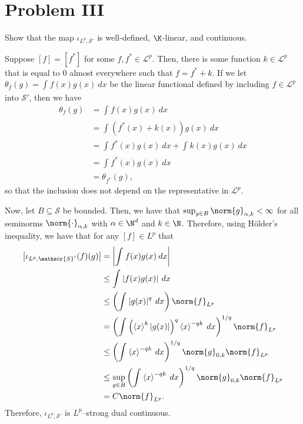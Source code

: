 \documentclass[10pt]{mypackage}
\begin{document}
\section{Problem III}%
\begin{problem}
  Show that the map $\iota_{L^p,\mathscr{S}'}$ is well-defined, $\K$-linear, and continuous.
\end{problem}
\begin{solution}
  Suppose $\left[ f \right] = \left[ f^{\ast} \right]$ for some $f,f^{\ast}\in \mathscr{L}^p$. Then, there is some function $k\in \mathscr{L}^{p}$ that is equal to $0$ almost everywhere such that $f = f^{\ast} + k$. If we let $\theta_{f}(g) = \int_{}^{} f(x)g(x)\:dx$ be the linear functional defined by including $f\in \mathscr{L}^{p}$ into $\mathscr{S}'$, then we have
  \begin{align*}
    \theta_{f}(g) &= \int_{}^{} f(x)g(x)\:dx\\
                  &= \int_{}^{} \left( f^{\ast}(x) + k(x) \right)g(x)\:dx\\
                  &= \int_{}^{} f^{\ast}\left( x \right)g(x)\:dx + \int_{}^{} k(x)g(x)\:dx\\
                  &= \int_{}^{} f^{\ast}\left( x \right)g(x)\:dx\\
                  &= \theta_{f^{\ast}}(g),
  \end{align*}
  so that the inclusion does not depend on the representative in $ \mathcal{L}^p $.

  Now, let $B\subseteq \mathscr{S}$ be bounded. Then, we have that $\sup_{g\in B}\norm{g}_{\alpha,k} < \infty$ for all seminorms $\norm{\cdot}_{\alpha,k}$ with $\alpha\in \N^d$ and $k\in \N$. Therefore, using Hölder's inequality, we have that for any $[f]\in L^p$ that
  \begin{align*}
    \left\vert \iota_{L^p,\mathscr{S}'}(f)(g) \right\vert &= \left\vert \int_{}^{} f(x)g(x)\:dx \right\vert\\
                                         &\leq \int_{}^{} \left\vert f(x)g(x) \right\vert\:dx\\
                                         &\leq \left( \int_{}^{} \left\vert g(x) \right\vert^{q}\:dx \right) \norm{f}_{L^p}\\
                                         &= \left( \int_{}^{}\left( \left\langle x \right\rangle^{k}\left\vert g(x) \right\vert \right)^{q} \left\langle x \right\rangle^{-qk}\:dx \right)^{1/q}\norm{f}_{L^p}\\
                                         &\leq \left( \int_{}^{} \left\langle x \right\rangle^{-qk}\:dx \right)^{1/q} \norm{g}_{0,k}\norm{f}_{L^p}\\
                                         &\leq \sup_{g\in B} \left( \int_{}^{} \left\langle x \right\rangle^{-qk}\:dx \right)^{1/q}\norm{g}_{0,k}\norm{f}_{L^p}\\
                                         &= C\norm{f}_{L^p}.
  \end{align*}
  Therefore, $\iota_{L^p,\mathscr{S}'}$ is $L^p$--strong dual continuous.
\end{solution}
\end{document}
